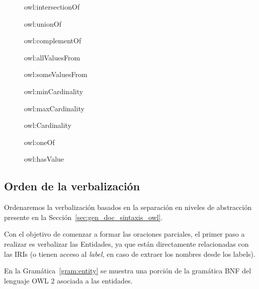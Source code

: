 \begin{figure}
\label{list:constructores_expresiones}
    \begin{itemize}
    \begin{multicols}{2}
        \item owl:intersectionOf
        \item owl:unionOf
        \item owl:complementOf
        \item owl:allValuesFrom
        \item owl:someValuesFrom 
        \item owl:minCardinality
        \item owl:maxCardinality
        \item owl:Cardinality
        \item owl:oneOf
        \item owl:hasValue
        \end{multicols}
    \end{itemize}
\end{figure}

\subsection{Orden de la verbalización}
Ordenaremos la verbalización basados en la separación en niveles de abstracción presente en la Sección~\ref{sec:gen_doc_sintaxis_owl}. 

Con el objetivo de comenzar a formar las oraciones parciales, el primer paso a realizar es verbalizar las Entidades, ya que están directamente relacionadas con las IRIs (o tienen acceso al \emph{label}, en caso de extraer los nombres desde los labels).

En la Gramática~\ref{gram:entity} se muestra una porción de la gramática BNF del lenguaje OWL 2 asociada a las entidades.
\begin{GrammarEnv}
\begin{grammar}
[(colon){$\rightarrow$}]
[(semicolon)$|$]
[(comma){}]
[(period){\vspace{0.3cm} \\}]
[(quote){\begin{bf}}{\end{bf}}]
[(nonterminal){$<$}{$>$}]
\end{grammar}
\label{gram:entity}
\end{GrammarEnv}

